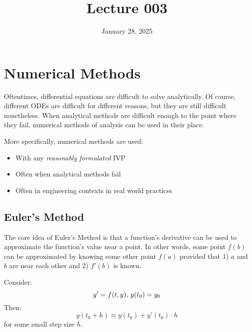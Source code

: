 \documentclass[12pt]{article}
\title{Lecture 003}
\date{January 28, 2025}
\begin{document}
\newpage
\section{Numerical Methods}
\label{sec:numericalMethods}

Oftentimes, differential equations are difficult to solve analytically. Of course, different ODEs are difficult for different reasons, but they are still difficult nonetheless. When analytical methods are difficult enough to the point where they fail, numerical methods of analysis can be used in their place.

More specifically, numerical methods are used:
\begin{itemize}
  \itemsep0em
  \item With any \textit{reasonably formulated} IVP
  \item Often when analytical methods fail
  \item Often in engineering contexts in real world practices
\end{itemize}

\subsection{Euler's Method}
\label{ssec:eulersMethod}

The core idea of Euler's Method is that a function's derivative can be used to approximate the function's value near a point. In other words, some point $f(b)$ can be approximated by knowing some other point $f(a)$ provided that 1) $a$ and $b$ are near each other and 2) $f'(b)$ is known.

Consider:
\begin{equation*}
  y' = f(t,y)\textup{, }y(t_0)=y_0
\end{equation*}
Then:
\begin{equation*}
  y(t_0+h) \approx y(t_0) + y'(t_0) \cdot h
\end{equation*}
for some small step size $h$.
\end{document}
